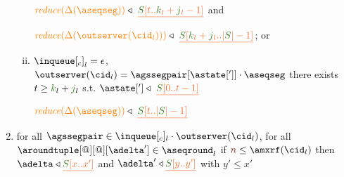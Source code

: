 \begin{definition}
\begin{enumerate}
\begin{enumerate}[i.]
     
     $\ireduce{\igetdeltas{\aseqseg}}\triangleleft \ \flatten{ \queuemessage[t..\tknown_l+\treceivebuffer_l-1]}$ and 
     
     $\ireduce{\igetdeltas{\outserver(\cid_l) }}\triangleleft \
       \flatten{\queuemessage[\tknown_l+\treceivebuffer_l..|\queuemessage| - 1]}$; or
      
%              
                 

%     
     
       
     \item ${\inclient}_l = \epsilon$,  $\outserver(\cid_l) = \agssegpair[{\astate[']}]\cdot \aseqseg$ there exists $t \geq \tknown_l+\treceivebuffer_l $ s.t.
      $\astate['] \triangleleft \ \flatten{\queuemessage[0 .. t - 1]}$ %
     
       $\ireduce{\igetdeltas{\aseqseg}}\triangleleft \ \flatten{ \queuemessage[t..|\queuemessage| - 1]}$  
     
	
	\end{enumerate}	
	
        \item \label{prop_deltas} for all $\agssegpair\in\inclient_l\cdot\outserver(\cid_l)$, 
		for all $\aroundtuple[@][@][\adelta'] \in\pending_l$
        if $\irounds\leq\amxrf(\cid_l)$ then $\adelta\triangleleft \flatten{\queuemessage[x..x']}$ and  $\adelta'\triangleleft \flatten{\queuemessage[y..y']}$
        with $y'\leq x'$

\end{enumerate}
	
\end{definition}


